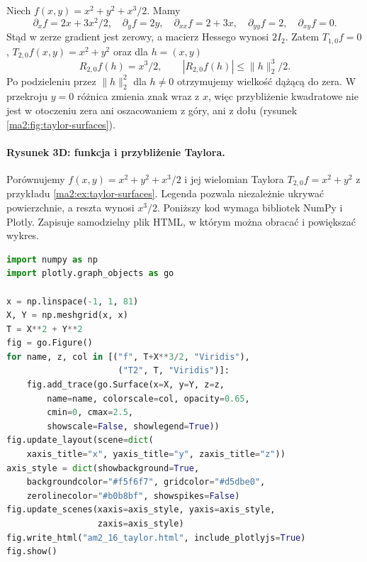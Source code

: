 \begin{przyklad}
\label{ma2:ex:taylor-surfaces}
Niech $f(x,y)=x^2+y^2+x^3/2$. Mamy
\[
 \partial_x f=2x+3x^2/2,\quad \partial_y f=2y,\quad
 \partial_{xx}f=2+3x,\quad \partial_{yy}f=2,\quad
 \partial_{xy}f=0.
\]
Stąd w zerze gradient jest zerowy, a macierz
Hessego wynosi $2I_2$. Zatem $T_{1,0}f=0$,
$T_{2,0}f(x,y)=x^2+y^2$ oraz dla $h=(x,y)$
\[
 R_{2,0}f(h)=x^3/2,\qquad
 |R_{2,0}f(h)|\le \|h\|_2^3/2.
\]
Po podzieleniu przez $\|h\|_2^2$ dla $h\ne0$
otrzymujemy wielkość dążącą do zera.
W przekroju $y=0$ różnica zmienia znak wraz z $x$,
więc przybliżenie kwadratowe nie jest w otoczeniu zera
ani oszacowaniem z góry, ani z dołu
(rysunek \ref{ma2:fig:taylor-surfaces}).
\end{przyklad}

\paragraph{Rysunek 3D: funkcja i przybliżenie Taylora.}
Porównujemy $f(x,y)=x^2+y^2+x^3/2$ i jej wielomian
Taylora $T_{2,0}f=x^2+y^2$ z przykładu
\ref{ma2:ex:taylor-surfaces}. Legenda pozwala niezależnie
ukrywać powierzchnie, a reszta wynosi $x^3/2$.
Poniższy kod wymaga bibliotek NumPy i Plotly. Zapisuje samodzielny
plik HTML, w którym można obracać i powiększać wykres.
\begin{lstlisting}[language=Python]
import numpy as np
import plotly.graph_objects as go

x = np.linspace(-1, 1, 81)
X, Y = np.meshgrid(x, x)
T = X**2 + Y**2
fig = go.Figure()
for name, z, col in [("f", T+X**3/2, "Viridis"),
                      ("T2", T, "Viridis")]:
    fig.add_trace(go.Surface(x=X, y=Y, z=z,
        name=name, colorscale=col, opacity=0.65,
        cmin=0, cmax=2.5,
        showscale=False, showlegend=True))
fig.update_layout(scene=dict(
    xaxis_title="x", yaxis_title="y", zaxis_title="z"))
axis_style = dict(showbackground=True,
    backgroundcolor="#f5f6f7", gridcolor="#d5dbe0",
    zerolinecolor="#b0b8bf", showspikes=False)
fig.update_scenes(xaxis=axis_style, yaxis=axis_style,
                  zaxis=axis_style)
fig.write_html("am2_16_taylor.html", include_plotlyjs=True)
fig.show()
\end{lstlisting}

